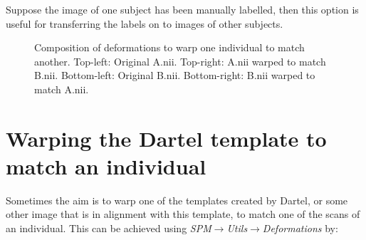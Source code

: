 Suppose the image of one subject has been manually labelled, then this option is useful for transferring the labels on to images of other subjects.

\begin{figure}
\begin{center}
\end{center}
\caption{
Composition of deformations to warp one individual to match another.
Top-left: Original A.nii.
Top-right: A.nii warped to match B.nii.
Bottom-left: Original B.nii.
Bottom-right: B.nii warped to match A.nii.
\label{Fig:AtoB}}
\end{figure}

\section{Warping the Dartel template to match an individual}
Sometimes the aim is to warp one of the templates created by Dartel, or some other image that is in alignment with this template, to match one of the scans of an individual.
This can be achieved using \emph{SPM$\rightarrow$Utils$\rightarrow$Deformations} by:
